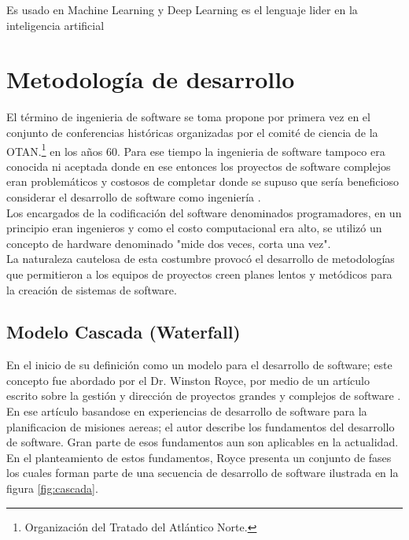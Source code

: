 Es usado en Machine Learning y Deep Learning es el lenguaje lider en la inteligencia artificial

\section{Metodología de desarrollo}
El término de ingenieria de software se toma propone por primera vez en el conjunto de conferencias históricas organizadas por el comité de ciencia de la OTAN.\footnote{Organización del Tratado del Atlántico Norte.} en los años 60. Para ese tiempo la ingenieria de software tampoco era conocida ni aceptada donde en ese entonces los proyectos de software complejos eran problemáticos y costosos de completar donde se supuso que sería beneficioso considerar el desarrollo de software como ingeniería \cite{Ganis}.\\

Los encargados de la codificación del software denominados programadores, en un principio eran ingenieros y como el costo computacional era alto, se utilizó un concepto de hardware denominado "mide dos veces, corta una vez"\cite{Ganis}.\\
La naturaleza cautelosa de esta costumbre provocó el desarrollo de metodologías que permitieron a los equipos de proyectos creen planes lentos y metódicos para la creación de sistemas de software.\\

\subsection{Modelo Cascada (Waterfall)}
En el inicio de su definición como un modelo para el desarrollo de software; este concepto fue abordado por el Dr. Winston Royce, por medio de un artículo escrito sobre la gestión y dirección de proyectos grandes y complejos de software \cite{Winston}. En ese artículo basandose en experiencias de desarrollo de software para la planificacion de misiones aereas; el autor describe los fundamentos del desarrollo de software. Gran parte de esos fundamentos aun son aplicables en la actualidad. En el planteamiento de estos fundamentos, Royce presenta un conjunto de fases los cuales forman parte de una secuencia de desarrollo de software ilustrada en la figura \ref{fig:cascada}.

